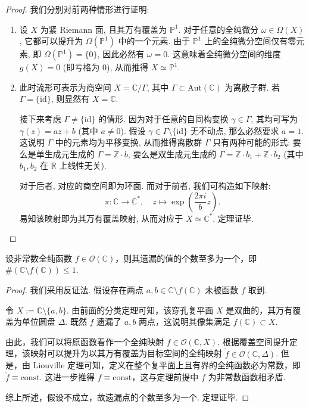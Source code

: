 \begin{proof}
我们分别对前两种情形进行证明:
\begin{enumerate}
    \item \qquad 设 $X$ 为紧 Riemann 面, 且其万有覆盖为 $\mathbb{P}^1$. 对于任意的全纯微分 $\omega \in \Omega(X)$, 它都可以提升为 $\Omega(\mathbb{P}^1)$ 中的一个元素. 由于 $\mathbb{P}^1$ 上的全纯微分空间仅有零元素, 即 $\Omega(\mathbb{P}^1) = \{0\}$, 因此必然有 $\omega = 0$. 这意味着全纯微分空间的维度 $g(X) = 0$ (即亏格为 0), 从而推得 $X \simeq \mathbb{P}^1$.
\item \qquad 此时流形可表示为商空间 $X = \mathbb{C}/\Gamma$, 其中 $\Gamma \subset \mathrm{Aut}(\mathbb{C})$ 为离散子群. 
若 $\Gamma = \{\mathrm{id}\}$, 则显然有 $X = \mathbb{C}$. 

\qquad 接下来考虑 $\Gamma \neq \{\mathrm{id}\}$ 的情形. 因为对于任意的自同构变换 $\gamma \in \Gamma$, 其均可写为 $\gamma(z) = az+b$ (其中 $a \neq 0$). 假设 $\gamma \in \Gamma \setminus \{\mathrm{id}\}$ 无不动点, 那么必然要求 $a=1$. 这说明 $\Gamma$ 中的元素均为平移变换, 从而推得离散群 $\Gamma$ 只有两种可能的形式: 
要么是单生成元生成的 $\Gamma = \mathbb{Z}\cdot b$, 要么是双生成元生成的 $\Gamma = \mathbb{Z}\cdot b_1 + \mathbb{Z}\cdot b_2$ (其中 $b_1, b_2$ 在 $\mathbb{R}$ 上线性无关).

\qquad 对于后者, 对应的商空间即为环面. 而对于前者, 我们可构造如下映射:
\[ \pi: \mathbb{C} \to \mathbb{C}^*, \quad z \mapsto \exp\left(\frac{2\pi i}{b} z\right). \]
易知该映射即为其万有覆盖映射, 从而对应于 $X \simeq \mathbb{C}^*$. 定理证毕.
\end{enumerate}
\end{proof}

\begin{theorem}
设非常数全纯函数 $f \in \mathcal{O}(\mathbb{C})$，则其遗漏的值的个数至多为一个，即 $\#(\mathbb{C} \setminus f(\mathbb{C})) \leqslant 1$.
\end{theorem}

\begin{proof}
我们采用反证法. 假设存在两点 $a, b \in \mathbb{C} \setminus f(\mathbb{C})$ 未被函数 $f$ 取到. 

令 $X := \mathbb{C} \setminus \{a, b\}$. 由前面的分类定理可知，该穿孔复平面 $X$ 是双曲的，其万有覆盖为单位圆盘 $\Delta$. 既然 $f$ 遗漏了 $a, b$ 两点，这说明其像集满足 $f(\mathbb{C}) \subset X$. 

由此，我们可以将原函数看作一个全纯映射 $f \in \mathcal{O}(\mathbb{C}, X)$. 根据覆盖空间提升定理，该映射可以提升为以其万有覆盖为目标空间的全纯映射 $\widetilde{f} \in \mathcal{O}(\mathbb{C}, \Delta)$. 但是，由 Liouville 定理可知，定义在整个复平面上且有界的全纯函数必为常数，即 $\widetilde{f} \equiv \mathrm{const}$. 这进一步推得 $f \equiv \mathrm{const}$，这与定理前提中 $f$ 为非常数函数相矛盾. 

综上所述，假设不成立，故遗漏点的个数至多为一个. 定理证毕.
\end{proof}



